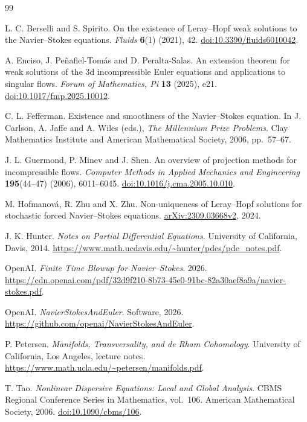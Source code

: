 \begin{thebibliography}{99}\small\raggedright

L. C. Berselli and S. Spirito. On the existence of Leray--Hopf weak solutions to the Navier--Stokes equations. \emph{Fluids} \textbf{6}(1) (2021), 42. \href{https://doi.org/10.3390/fluids6010042}{doi:10.3390/fluids6010042}.

A. Enciso, J. Pe\~nafiel-Tom\'as and D. Peralta-Salas. An extension theorem for weak solutions of the 3d incompressible Euler equations and applications to singular flows. \emph{Forum of Mathematics, Pi} \textbf{13} (2025), e21. \href{https://doi.org/10.1017/fmp.2025.10012}{doi:10.1017/fmp.2025.10012}.

C. L. Fefferman. Existence and smoothness of the Navier--Stokes equation. In J. Carlson, A. Jaffe and A. Wiles (eds.), \emph{The Millennium Prize Problems}. Clay Mathematics Institute and American Mathematical Society, 2006, pp.~57--67.

J. L. Guermond, P. Minev and J. Shen. An overview of projection methods for incompressible flows. \emph{Computer Methods in Applied Mechanics and Engineering} \textbf{195}(44--47) (2006), 6011--6045. \href{https://doi.org/10.1016/j.cma.2005.10.010}{doi:10.1016/j.cma.2005.10.010}.

M. Hofmanov\'a, R. Zhu and X. Zhu. Non-uniqueness of Leray--Hopf solutions for stochastic forced Navier--Stokes equations. \href{https://arxiv.org/abs/2309.03668v2}{arXiv:2309.03668v2}, 2024.

J. K. Hunter. \emph{Notes on Partial Differential Equations}. University of California, Davis, 2014. \url{https://www.math.ucdavis.edu/~hunter/pdes/pde_notes.pdf}.

OpenAI. \emph{Finite Time Blowup for Navier--Stokes}. 2026. \url{https://cdn.openai.com/pdf/32d9f210-8b73-45e0-91bc-82a30aef8a9a/navier-stokes.pdf}.

OpenAI. \emph{NavierStokesAndEuler}. Software, 2026. \url{https://github.com/openai/NavierStokesAndEuler}.

P. Petersen. \emph{Manifolds, Transversality, and de Rham Cohomology}. University of California, Los Angeles, lecture notes. \url{https://www.math.ucla.edu/~petersen/manifolds.pdf}.

T. Tao. \emph{Nonlinear Dispersive Equations: Local and Global Analysis}. CBMS Regional Conference Series in Mathematics, vol.~106. American Mathematical Society, 2006. \href{https://doi.org/10.1090/cbms/106}{doi:10.1090/cbms/106}.


\end{thebibliography}
